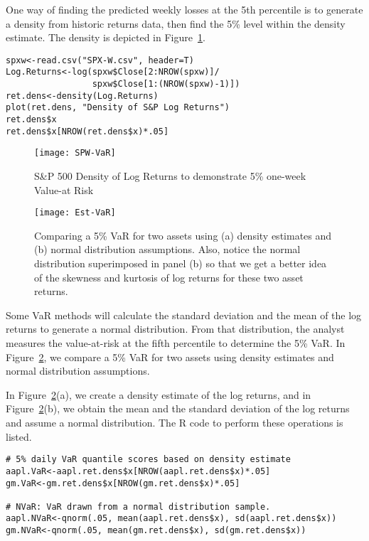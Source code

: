 One way of finding the predicted weekly losses at the 5th percentile is to generate a density from historic returns data, then find the 5\% level within the density estimate. The density is depicted in Figure~\ref{figure:SPW-VaR}.
\begin{verbatim}
spxw<-read.csv("SPX-W.csv", header=T)
Log.Returns<-log(spxw$Close[2:NROW(spxw)]/
                 spxw$Close[1:(NROW(spxw)-1)])
ret.dens<-density(Log.Returns)
plot(ret.dens, "Density of S&P Log Returns")
ret.dens$x
ret.dens$x[NROW(ret.dens$x)*.05]
\end{verbatim}

\begin{figure}[tb]
  \centering
  \texttt{[image: SPW-VaR]}
  \caption[S\&P 500 Density of Log Returns]{S\&P 500 Density of Log Returns to demonstrate 5\% one-week Value-at Risk }
  \label{figure:SPW-VaR}
\end{figure}

\begin{figure}[tb]
  \centering
  \texttt{[image: Est-VaR]}
  \caption[Comparing Density of Log Returns]{Comparing a 5\% VaR for two assets using (a) density estimates and (b) normal distribution assumptions. Also, notice the normal distribution superimposed in panel (b) so that we get a better idea of the skewness and kurtosis of log returns for these two asset returns.}
  \label{figure:est-VaR}
\end{figure}

Some VaR methods will calculate the standard deviation and the mean of the log returns to generate a normal distribution. From that distribution, the analyst measures the value-at-risk at the fifth percentile to determine the 5\% VaR. In Figure~\ref{figure:est-VaR}, we compare a 5\% VaR for two assets using density estimates and normal distribution assumptions.

In Figure~\ref{figure:est-VaR}(a), we create a density estimate of the log returns, and in Figure~\ref{figure:est-VaR}(b), we obtain the mean and the standard deviation of the log returns and assume a normal distribution. The R code to perform these operations is listed.

\begin{verbatim}
# 5% daily VaR quantile scores based on density estimate
aapl.VaR<-aapl.ret.dens$x[NROW(aapl.ret.dens$x)*.05]
gm.VaR<-gm.ret.dens$x[NROW(gm.ret.dens$x)*.05]

# NVaR: VaR drawn from a normal distribution sample.
aapl.NVaR<-qnorm(.05, mean(aapl.ret.dens$x), sd(aapl.ret.dens$x))
gm.NVaR<-qnorm(.05, mean(gm.ret.dens$x), sd(gm.ret.dens$x))
\end{verbatim}

